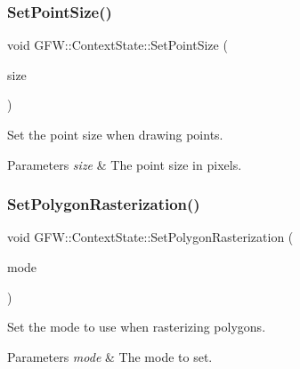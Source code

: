 \subsubsection{\texorpdfstring{Set\+Point\+Size()}{SetPointSize()}}
{\footnotesize\ttfamily void G\+F\+W\+::\+Context\+State\+::\+Set\+Point\+Size (\begin{DoxyParamCaption}\item[{float}]{size }\end{DoxyParamCaption})}



Set the point size when drawing points. 


\begin{DoxyParams}{Parameters}
{\em size} & The point size in pixels. \\
\hline
\end{DoxyParams}
\mbox{\label{class_g_f_w_1_1_context_state_a85d785bbab573d3e336874c52aad937d}} 
\subsubsection{\texorpdfstring{Set\+Polygon\+Rasterization()}{SetPolygonRasterization()}}
{\footnotesize\ttfamily void G\+F\+W\+::\+Context\+State\+::\+Set\+Polygon\+Rasterization (\begin{DoxyParamCaption}\item[{\hyperlink{namespace_g_f_w_a9e0ba6f593449f3060559ead1bc7e92f}{Rasterization\+Mode}}]{mode }\end{DoxyParamCaption})}



Set the mode to use when rasterizing polygons. 


\begin{DoxyParams}{Parameters}
{\em mode} & The mode to set. \\
\hline
\end{DoxyParams}
\mbox{\label{class_g_f_w_1_1_context_state_ace57bac69f05af23f1f65626a83cf22b}} 
